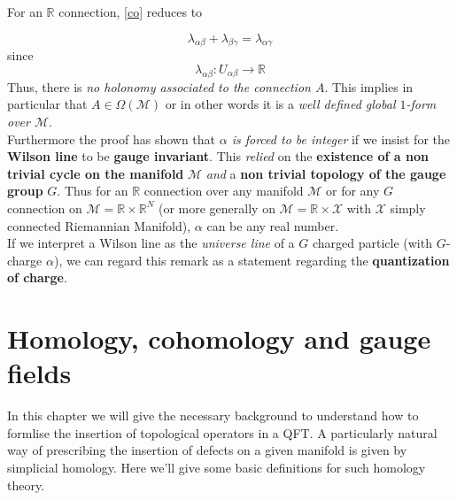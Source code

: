 \begin{rem}
    For an $\mathbb{R}$ connection, \eqref{co} reduces to

    \begin{equation}
    \lambda_{\alpha \beta} + \lambda_{\beta \gamma} = \lambda_{\alpha \gamma} 
\end{equation}
since
\begin{equation}
    \lambda_{\alpha \beta}: U_{\alpha \beta}  \to \mathbb{R}
\end{equation}
Thus, there is \textit{no holonomy associated to the connection $A$}. This implies in particular that $A \in \Omega(\mathcal{M})$ or in other words it is a \textit{well defined global $1$-form over $\mathcal{M}$}. \\

Furthermore the proof has shown that \textit{$\alpha$ is forced to be integer} if we insist for the \textbf{Wilson line} to be \textbf{gauge invariant}. This \textit{relied} on the \textbf{existence of a non trivial cycle on the manifold} $\mathcal{M}$ \textit{and} a \textbf{non trivial topology of the gauge group} $G$. Thus for an $\mathbb{R}$ connection over any manifold $\mathcal{M}$ or for any $G$ connection on $\mathcal{M} = \mathbb{R} \times \mathbb{R}^N$ (or more generally on $\mathcal{M} = \mathbb{R} \times \mathcal{X}$ with $\mathcal{X}$ simply connected Riemannian Manifold), $\alpha$ can be any real number. \\

If we interpret a Wilson line as the \textit{universe line} of a $G$ charged particle (with $G$-charge $\alpha$), we can regard this remark as a statement regarding the \textbf{quantization of charge}.    
\end{rem}

\section{Homology, cohomology and gauge fields}
In this chapter we will give the necessary background to understand how to formlise the insertion of topological operators in a QFT. A particularly natural way of prescribing the insertion of defects on a given manifold is given by simplicial homology. Here we'll give some basic definitions for such homology theory.\\

